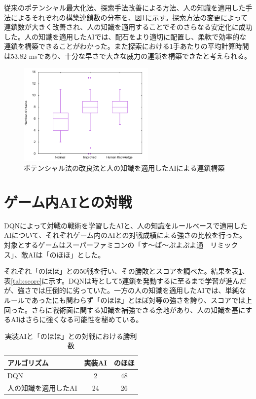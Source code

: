 \documentclass[twocolumn, a4paper]{UECIEresume}
\begin{document}
従来のポテンシャル最大化法、探索手法改善による方法、人の知識を適用した手法によるそれぞれの構築連鎖数の分布を、図\ref{fig:chain}に示す。探索方法の変更によって連鎖数が大きく改善され、人の知識を適用することでそのさらなる安定化に成功した。人の知識を適用したAIでは、配石をより適切に配置し、柔軟で効率的な連鎖を構築できることがわかった。また探索における1手あたりの平均計算時間は53.82 msであり、十分な早さで大きな威力の連鎖を構築できたと考えられる。

\begin{figure}[htb]
  \begin{center}
  \includegraphics[height=5cm]{../graph/chain.png}
  \caption{ポテンシャル法の改良法と人の知識を適用したAIによる連鎖構築} \label{fig:chain}
\end{center}
\end{figure}

\section{ゲーム内AIとの対戦}
DQNによって対戦の戦術を学習したAIと、人の知識をルールベースで適用したAIについて、それぞれゲーム内のAIとの対戦成績による強さの比較を行った。対象とするゲームはスーパーファミコンの「す〜ぱ〜ぷよぷよ通　リミックス」、敵AIは「のほほ」とした。%

それぞれ「のほほ」との50戦を行い、その勝敗とスコアを調べた。結果を表\ref{tab:win}、表\ref{tab:score}に示す。DQNは時として5連鎖を発動するに至るまで学習が進んだが、強さでは圧倒的に劣っていた。一方の人の知識を適用したAIでは、単純なルールであったにも関わらず「のほほ」とほぼ対等の強さを誇り、スコアでは上回った。さらに戦術面に関する知識を補強できる余地があり、人の知識を基にするAIはさらに強くなる可能性を秘めている。


\begin{table}[tbp]
\begin{center}
\caption{実装AIと「のほほ」との対戦における勝利数} \label{tab:win}
  \begin{tabular}{|l|c|c|} \hline
アルゴリズム & 実装AI & のほほ\\ \hline
DQN & 2 & 48\\ \hline
人の知識を適用したAI & 24 & 26\\ \hline
\end{tabular}
\end{center}
\end{table}
\end{document}
